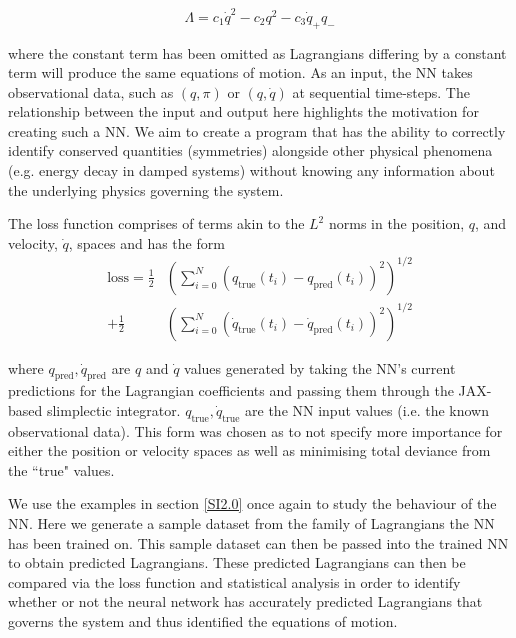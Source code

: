 \documentclass[10pt]{iopart}
\begin{document}
\begin{equation}
	\label{DHOFamily}
	\Lambda = c_1\dot{q}^2 - c_2q^2 - c_3\dot{q}_+q_-
\end{equation}

where the constant term has been omitted as Lagrangians differing by a constant term will produce the same equations of motion. As an input, the NN takes observational data, such as $(q,\pi)$ or $(q,\dot{q})$ at sequential time-steps. The relationship between the input and output here highlights the motivation for creating such a NN. We aim to create a program that has the ability to correctly identify conserved quantities (symmetries) alongside other physical phenomena (e.g. energy decay in damped systems) without knowing any information about the underlying physics governing the system. 

The loss function comprises of terms akin to the $L^2$ norms in the position, $q$, and velocity, $\dot q$, spaces and has the form
\begin{equation}
\begin{split}
		\label{lossfunc}
	\textrm{loss} = \frac{1}{2}&\left(\sum_{i=0}^N (q_{\textrm{true}}(t_i) - q_{\textrm{pred}}(t_i))^2\right)^{1/2} \\ +  \frac{1}{2}&\left(\sum_{i=0}^N (\dot{q}_{\textrm{true}}(t_i) - \dot{q}_{\textrm{pred}}(t_i))^2\right)^{1/2}
\end{split}
\end{equation}

where $q_{\textrm{pred}}, \dot{q}_{\textrm{pred}}$ are $q$ and $\dot q$ values generated by taking the NN's current predictions for the Lagrangian coefficients and passing them through the JAX-based slimplectic integrator. $q_{\textrm{true}}, \dot{q}_{\textrm{true}}$ are the NN input values (i.e. the known observational data). This form was chosen as to not specify more importance for either the position or velocity spaces as well as minimising total deviance from the ``true" values.

We use the examples in section \ref{SI2.0} once again to study the behaviour of the NN. Here we generate a sample dataset from the family of Lagrangians the NN has been trained on. This sample dataset can then be passed into the trained NN to obtain predicted Lagrangians. These predicted Lagrangians can then be compared via the loss function and statistical analysis in order to identify whether or not the neural network has accurately predicted Lagrangians that governs the system and thus identified the equations of motion.
\end{document}
